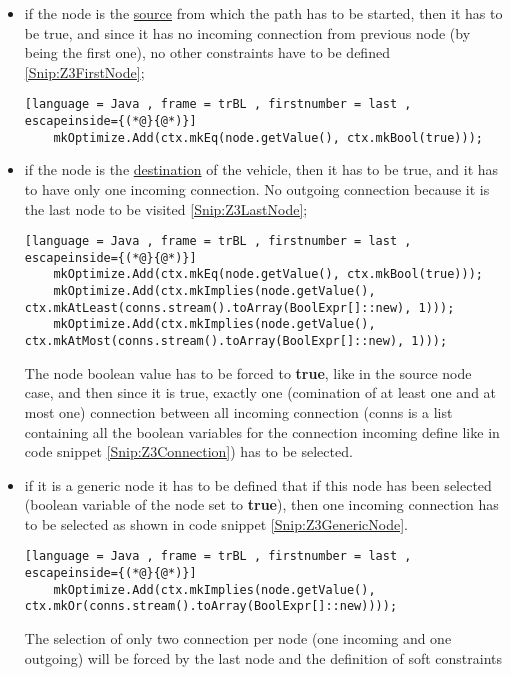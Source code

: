 \begin{itemize}
  \item if the node is the \underline{source} from which the path has to be started, then it has to be true, and since it has no incoming connection from previous node (by being the first one), no other constraints have to be defined \ref{Snip:Z3FirstNode};
  \begin{lstlisting}[language = Java , frame = trBL , firstnumber = last , escapeinside={(*@}{@*)}]
    mkOptimize.Add(ctx.mkEq(node.getValue(), ctx.mkBool(true)));
  \end{lstlisting}\label{Snip:Z3FirstNode}
  \item if the node is the \underline{destination} of the vehicle, then it has to be true, and it has to have only one incoming connection. No outgoing connection because it is the last node to be visited \ref{Snip:Z3LastNode};
  \begin{lstlisting}[language = Java , frame = trBL , firstnumber = last , escapeinside={(*@}{@*)}]
    mkOptimize.Add(ctx.mkEq(node.getValue(), ctx.mkBool(true)));
    mkOptimize.Add(ctx.mkImplies(node.getValue(), ctx.mkAtLeast(conns.stream().toArray(BoolExpr[]::new), 1)));
    mkOptimize.Add(ctx.mkImplies(node.getValue(), ctx.mkAtMost(conns.stream().toArray(BoolExpr[]::new), 1)));
  \end{lstlisting}
  The node boolean value has to be forced to \textbf{true}, like in the source node case, and then since it is true, exactly one (comination of at least one and at most one) connection between all incoming connection (conns is a list containing all the boolean variables for the connection incoming define like in code snippet \ref{Snip:Z3Connection}) has to be selected.
  \item if it is a generic node it has to be defined that if this node has been selected (boolean variable of the node set to \textbf{true}), then one incoming connection has to be selected as shown in code snippet \ref{Snip:Z3GenericNode}.
  \begin{lstlisting}[language = Java , frame = trBL , firstnumber = last , escapeinside={(*@}{@*)}]
    mkOptimize.Add(ctx.mkImplies(node.getValue(), ctx.mkOr(conns.stream().toArray(BoolExpr[]::new))));
  \end{lstlisting}\label{Snip:Z3GenericNode}
  The selection of only two connection per node (one incoming and one outgoing) will be forced by the last node and the definition of soft constraints
\end{itemize}


